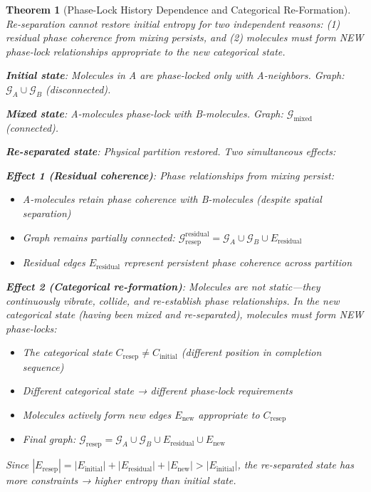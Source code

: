 \documentclass[12pt,a4paper]{article}
\newtheorem{theorem}{Theorem}[section]
\theoremstyle{remark}
\begin{document}
\begin{theorem}[Phase-Lock History Dependence and Categorical Re-Formation]
\label{thm:phase_lock_history}
Re-separation cannot restore initial entropy for two independent reasons: (1) residual phase coherence from mixing persists, and (2) molecules must form NEW phase-lock relationships appropriate to the new categorical state.

\textbf{Initial state}: Molecules in A are phase-locked only with A-neighbors. Graph: $\mathcal{G}_A \cup \mathcal{G}_B$ (disconnected).

\textbf{Mixed state}: A-molecules phase-lock with B-molecules. Graph: $\mathcal{G}_{\text{mixed}}$ (connected).

\textbf{Re-separated state}: Physical partition restored. Two simultaneous effects:

\textbf{Effect 1 (Residual coherence)}: Phase relationships from mixing persist:
\begin{itemize}
\item A-molecules retain phase coherence with B-molecules (despite spatial separation)
\item Graph remains partially connected: $\mathcal{G}_{\text{resep}}^{\text{residual}} = \mathcal{G}_A \cup \mathcal{G}_B \cup E_{\text{residual}}$
\item Residual edges $E_{\text{residual}}$ represent persistent phase coherence across partition
\end{itemize}

\textbf{Effect 2 (Categorical re-formation)}: \textit{Molecules are not static}—they continuously vibrate, collide, and re-establish phase relationships. In the new categorical state (having been mixed and re-separated), molecules must form NEW phase-locks:
\begin{itemize}
\item The categorical state $C_{\text{resep}} \neq C_{\text{initial}}$ (different position in completion sequence)
\item Different categorical state → different phase-lock requirements
\item Molecules actively form new edges $E_{\text{new}}$ appropriate to $C_{\text{resep}}$
\item Final graph: $\mathcal{G}_{\text{resep}} = \mathcal{G}_A \cup \mathcal{G}_B \cup E_{\text{residual}} \cup E_{\text{new}}$
\end{itemize}

Since $|E_{\text{resep}}| = |E_{\text{initial}}| + |E_{\text{residual}}| + |E_{\text{new}}| > |E_{\text{initial}}|$, the re-separated state has more constraints → higher entropy than initial state.
\end{theorem}
\end{document}
